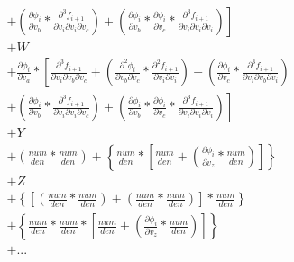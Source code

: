 \documentclass[12pt,letter]{article}
\begin{document}
\begin{equation}
\begin{split}
	\\
	&
	\left.
	+ \left(\frac{\partial \phi_i}{\partial v_b} * \frac{\partial^3 f_{i+1}}{\partial v_i \partial v_i \partial v_c}\right) + 
	\left(\frac{\partial \phi_i}{\partial v_b} * \frac{\partial \phi_i}{\partial v_c} * \frac{\partial^3 f_{i+1}}{\partial v_i \partial v_i \partial v_i}\right)\right]
	\\
	&+
	W
	\\
	&+
	\frac{\partial \phi_i}{\partial v_a} * 
	\left[\frac{\partial^3 f_{i+1}}{\partial v_i \partial v_b \partial v_c} + 
	\left(\frac{\partial^2 \phi_i}{\partial v_b \partial v_c} * \frac{\partial^2 f_{i+1}}{\partial v_i \partial v_i}\right) + 
	\left(\frac{\partial \phi_i}{\partial v_c} * \frac{\partial^3 f_{i+1}}{\partial v_i \partial v_b \partial v_i}\right) 
	\right.
	\\
	&
	\left.
	+ \left(\frac{\partial \phi_i}{\partial v_b} * \frac{\partial^3 f_{i+1}}{\partial v_i \partial v_i \partial v_c}\right) + 
	\left(\frac{\partial \phi_i}{\partial v_b} * \frac{\partial \phi_i}{\partial v_c} * \frac{\partial^3 f_{i+1}}{\partial v_i \partial v_i \partial v_i}\right)\right]
	\\
	&+
	Y
	\\
	&+
	\left(\frac{num}{den} * \frac{num}{den}\right) +
	\left\{\frac{num}{den} * \left[\frac{num}{den} + \left(\frac{\partial \phi_i}{\partial v_z} * \frac{num}{den}\right)\right]\right\}
	\\
	&+
	Z
	\\
	&+
	\left\{\left[\left(\frac{num}{den} * \frac{num}{den}\right) + \left(\frac{num}{den} * \frac{num}{den}\right)\right] * \frac{num}{den}\right\}
	\\
	&+
	\left\{\frac{num}{den} * \frac{num}{den} * \left[\frac{num}{den} + \left(\frac{\partial \phi_i}{\partial v_z} * \frac{num}{den}\right)\right]\right\}
	\\
	&+
	...
	\end{split}
	\end{equation}
\end{document}
